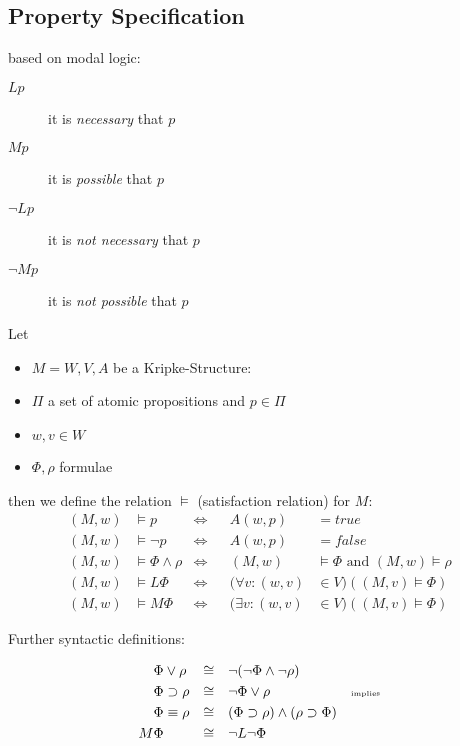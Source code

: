 \documentclass[a4paper, 10pt]{article}
\begin{document}
\subsection{Property Specification}

based on modal logic:
\begin{description}
    \item[$Lp$] it is \emph{necessary} that $p$
    \item[$Mp$] it is \emph{possible} that $p$
    \item[$\neg Lp$] it is \emph{not necessary} that $p$
    \item[$\neg Mp$] it is \emph{not possible} that $p$
\end{description}

\begin{mdframed}[roundcorner=5pt,
subtitlebelowline=false,subtitleaboveline=false,
subtitlebackgroundcolor=blue!30,
frametitlerule=true,
frametitlebackgroundcolor=blue!30,
frametitle={Kripke-Structure}
]
Let
\begin{itemize}
    \item $M=W,V,A$ be a Kripke-Structure:
    \item $\Pi$ a set of atomic propositions and $p\in\Pi$
    \item $w,v\in W$
    \item $\Phi,\rho$ formulae
\end{itemize}
then we define the relation $\models$ (satisfaction relation) for $M$:
\begin{align*}
(M,w)&\models p & \iff&& A(w,p)&=true \\
(M,w)&\models\neg p& \iff&& A(w,p)&=false \\
(M,w)&\models\Phi\wedge\rho & \iff&& (M,w)&\models\Phi \text{ and } (M,w)\models \rho \\
(M,w)&\models L\Phi& \iff& & (\forall v:(w,v)&\in V)((M,v)\models\Phi) \\
(M,w)&\models M\Phi& \iff& & (\exists v:(w,v)&\in V)((M,v)\models\Phi)
\end{align*}

Further syntactic definitions:

\begin{align*}
\Phi&\vee\rho & \cong && &\neg(\neg\Phi\wedge\neg\rho) \\
\Phi&\supset\rho & \cong && &\neg\Phi\vee\rho & \text{\tiny implies}\\
\Phi&\equiv\rho & \cong && &(\Phi\supset\rho)\wedge(\rho\supset\Phi)\\
M\Phi& &\cong&& &\neg L\neg\Phi
\end{align*}
\end{mdframed}
\end{document}
